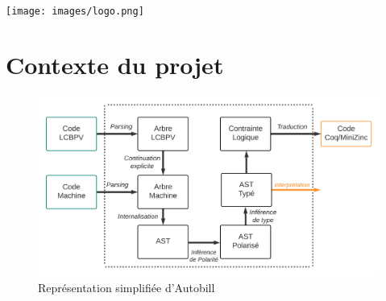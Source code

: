 \documentclass[12pt]{article}
\begin{document}
\begin{titlepage}
\begin{minipage}{0.55\textwidth}
\begin{flushright}
\vspace{2.5cm}
\end{flushright}
\end{minipage}\\[1cm]





\texttt{[image: images/logo.png]}\\[1cm] %
 

\vfill %

\end{titlepage}
\newpage

{
  \hypersetup{linkcolor=}
  \setcounter{tocdepth}{3}
  \tableofcontents
}
\newpage
\section{Contexte du projet}\label{contexte-du-projet}
\begin{figure}
  \centering
  \includegraphics[scale=0.55]{Figures/Schema_Autobill.png}
  \caption{Représentation simplifiée d'Autobill\label{fig1}}
\end{figure}
\end{document}

